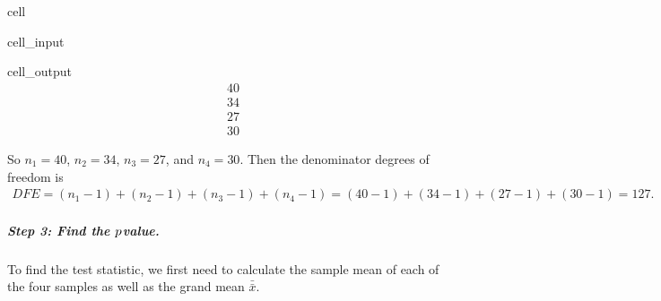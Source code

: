 \documentclass[letterpaper,10pt,english]{jupyterBook}
\begin{document}
\begin{sphinxuseclass}{cell}
\begin{sphinxVerbatimInput}
\begin{sphinxuseclass}{cell_input}
\end{sphinxuseclass}\end{sphinxVerbatimInput}
\begin{sphinxVerbatimOutput}

\begin{sphinxuseclass}{cell_output}\begin{equation*}
\begin{split}40\end{split}
\end{equation*}\begin{equation*}
\begin{split}34\end{split}
\end{equation*}\begin{equation*}
\begin{split}27\end{split}
\end{equation*}\begin{equation*}
\begin{split}30\end{split}
\end{equation*}
\end{sphinxuseclass}\end{sphinxVerbatimOutput}

\end{sphinxuseclass}
\sphinxAtStartPar
So \(n_1 = 40\), \(n_2 = 34\), \(n_3 = 27\), and \(n_4 = 30\). Then the denominator degrees of freedom is
\begin{equation*}
\begin{split} DFE = (n_1 - 1) + (n_2 - 1) + (n_3 - 1) + (n_4 - 1) = (40 - 1) + (34 - 1) + (27 - 1) + (30 - 1) = 127.\end{split}
\end{equation*}

\subparagraph{Step 3: Find the \protect\(p\protect\)\sphinxhyphen{}value.}
\label{\detokenize{Ch9 Hypothesis Tests of Two or More Populations/9.3 ANOVA:step-3-find-the-p-value}}
\sphinxAtStartPar
To find the test statistic, we first need to calculate the sample mean of each of the four samples as well as the grand mean \(\bar{\bar{x}}\).
\end{document}
